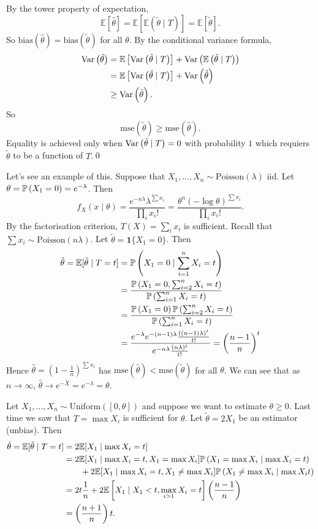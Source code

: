 \documentclass{article}
\begin{document}
\pf By the tower property of expectation,
\[
	\mathbb E[\hat\theta] = \mathbb E[ \mathbb E(\tilde\theta\mid T)] = \mathbb E[\tilde \theta].
\]
So $ \mathrm{bias}(\hat\theta) = \mathrm{bias}(\tilde\theta) $ for all $ \theta $. By the conditional variance formula,
\begin{align*}
	\operatorname{Var}\left({\tilde \theta}\right) &= \mathbb E\left[\operatorname{Var}\left({\tilde\theta\mid T}\right)\right] + \operatorname{Var}\left({\mathbb E\left(\tilde \theta\mid T\right)}\right)\\
			    &= \mathbb E\left[\operatorname{Var}\left({\tilde\theta\mid T}\right)\right] + \operatorname{Var}\left({\hat\theta}\right)\\
			    &\ge \operatorname{Var}\left({\hat\theta}\right).
\end{align*}
So
\[
	\mathrm{mse}(\tilde\theta)\ge \mathrm{mse}(\hat\theta).
\]
Equality is achieved only when $ \operatorname{Var}\left({\tilde\theta\mid T}\right) = 0 $ with probability $ 1 $ which requiers $ \tilde \theta $ to be a function of $ T $.\qed
\par Let's see an example of this. Suppose that $ X_1,\dots, X_n\sim \text{Poisson}(\lambda) $ iid. Let $ \theta = \mathbb{P}\left({X_1=0}\right)=e^{-\lambda} $. Then
\[
	f_X(x\mid\theta) = \frac{e^{-n\lambda}\lambda^{\sum x_i}}{\prod_i x_i!} = \frac{\theta^n (-\log \theta)^{\sum x_i}}{\prod_i x_i!}.
\]
By the factorisation criterion, $ T(X) = \sum_i x_i $ is sufficient. Recall that $ \sum x_i \sim \text{Poisson}(n\lambda) $. Let $ \tilde\theta = \mathbf 1\{X_1 = 0\} $. Then
\begin{align*}
	\hat \theta = \mathbb E[\tilde\theta\mid T=t] &= \mathbb{P}\left({X_1 = 0\mid \sum_{i=1}^n X_i = t}\right)\\
						      &= \frac{\mathbb{P}\left({X_1  =0, \sum_{i=2}^n X_i = t}\right)}{\mathbb{P}\left({\sum_{i=1}^n X_i = t}\right)}\\
						      &= \frac{\mathbb{P}\left({X_1 = 0}\right)\mathbb{P}\left({\sum_{i=2}^n X_i = t}\right)}{\mathbb{P}\left({\sum_{i=1}^n X_i =t}\right)}\\
						      &= \frac{e^{-\lambda }e^{-(n-1)\lambda}\frac{((n-1)\lambda)^t}{t!}}{e^{-n\lambda} \frac{(n\lambda)^t}{t!}} = \left(\frac{n-1}n\right)^t
\end{align*}
Hence $ \hat\theta= \left(1-\frac1n\right)^{\sum x_i} $ has $ \mathrm{mse}(\hat\theta)< \mathrm{mse}(\tilde\theta) $ for all $ \theta $.  We can see that as $ n\to \infty $, $ \hat\theta\to e^{-\overline X} = e^{-\lambda} =\theta$.
\par
Let $ X_1,\dots, X_n\sim \mathrm{Uniform}([0,\theta]) $ and suppose we want to estimate $ \theta\ge 0 $. Last time we saw that $ T = \max{X_i} $ is sufficient for $ \theta $. Let $ \tilde\theta = 2X_1 $ be an estimator (unbias). Then
\begin{align*}
	\hat \theta = \mathbb E[\tilde\theta\mid T=t] &= 2\mathbb E[X_1\mid \max X_i =t]\\
						      &= 2\mathbb E[X_1\mid \max X_i = t, X_1 = \max X_i]\mathbb{P}\left({X_1 = \max X_i\mid \max X_i = t}\right)\\
						      &\qquad+ 2\mathbb E[X_1\mid \max X_i =t, X_1\ne \max X_i] \mathbb{P}\left({X_1\ne \max X_i \mid \max X_i t}\right)\\
						      &= 2t\frac 1n + 2\mathbb E\left[X_1\mid X_1<t, \max_{i>1} X_i =t\right]\left(\frac{n-1}n\right)\\
						      &=\left(\frac{n+1}n\right)t.
\end{align*}
\end{document}
